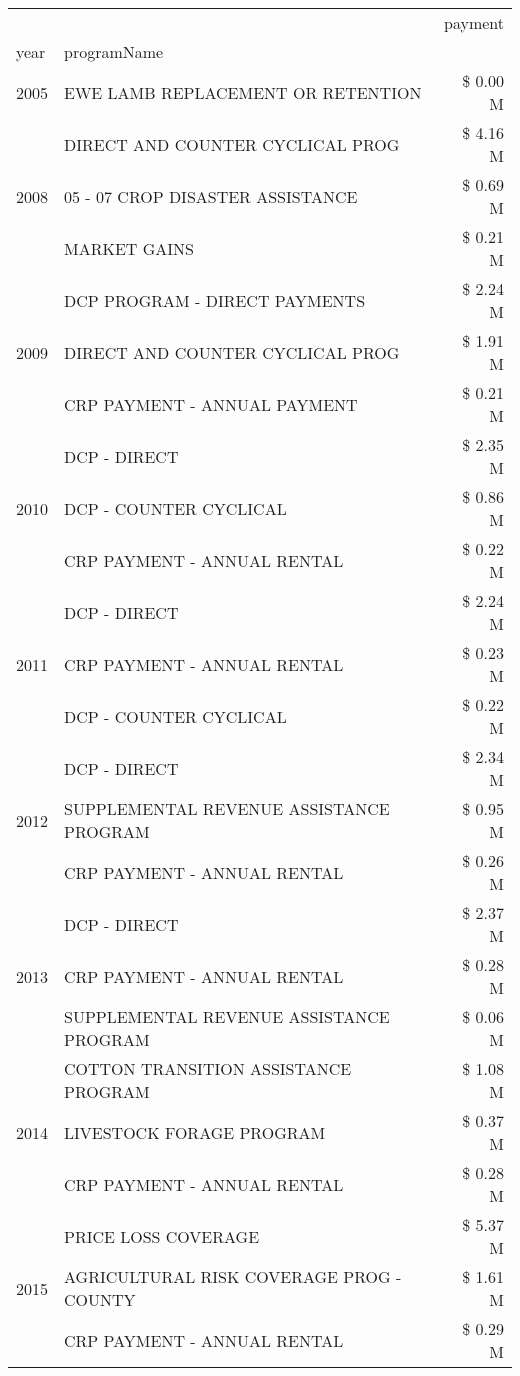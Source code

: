 \begin{tabular}{llr}
\toprule
 &  & payment \\
year & programName &  \\
\midrule
2005 & EWE LAMB REPLACEMENT OR RETENTION & \$ 0.00 M \\
\cline{1-3}
\multirow[t]{3}{*}{2008} & DIRECT AND COUNTER CYCLICAL PROG & \$ 4.16 M \\
 & 05 - 07 CROP DISASTER ASSISTANCE & \$ 0.69 M \\
 & MARKET GAINS & \$ 0.21 M \\
\cline{1-3}
\multirow[t]{3}{*}{2009} & DCP PROGRAM - DIRECT PAYMENTS & \$ 2.24 M \\
 & DIRECT AND COUNTER CYCLICAL PROG & \$ 1.91 M \\
 & CRP PAYMENT - ANNUAL PAYMENT & \$ 0.21 M \\
\cline{1-3}
\multirow[t]{3}{*}{2010} & DCP - DIRECT & \$ 2.35 M \\
 & DCP - COUNTER CYCLICAL & \$ 0.86 M \\
 & CRP PAYMENT - ANNUAL RENTAL & \$ 0.22 M \\
\cline{1-3}
\multirow[t]{3}{*}{2011} & DCP - DIRECT & \$ 2.24 M \\
 & CRP PAYMENT - ANNUAL RENTAL & \$ 0.23 M \\
 & DCP - COUNTER CYCLICAL & \$ 0.22 M \\
\cline{1-3}
\multirow[t]{3}{*}{2012} & DCP - DIRECT & \$ 2.34 M \\
 & SUPPLEMENTAL REVENUE ASSISTANCE PROGRAM & \$ 0.95 M \\
 & CRP PAYMENT - ANNUAL RENTAL & \$ 0.26 M \\
\cline{1-3}
\multirow[t]{3}{*}{2013} & DCP - DIRECT & \$ 2.37 M \\
 & CRP PAYMENT - ANNUAL RENTAL & \$ 0.28 M \\
 & SUPPLEMENTAL REVENUE ASSISTANCE PROGRAM & \$ 0.06 M \\
\cline{1-3}
\multirow[t]{3}{*}{2014} & COTTON TRANSITION ASSISTANCE PROGRAM & \$ 1.08 M \\
 & LIVESTOCK FORAGE PROGRAM & \$ 0.37 M \\
 & CRP PAYMENT - ANNUAL RENTAL & \$ 0.28 M \\
\cline{1-3}
\multirow[t]{3}{*}{2015} & PRICE LOSS COVERAGE & \$ 5.37 M \\
 & AGRICULTURAL RISK COVERAGE PROG - COUNTY & \$ 1.61 M \\
 & CRP PAYMENT - ANNUAL RENTAL & \$ 0.29 M \\

\end{tabular}
